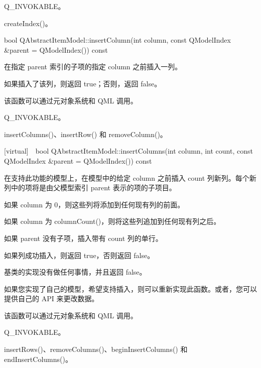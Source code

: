 \begin{seeAlso}
Q\_INVOKABLE。
\end{seeAlso}

\begin{seeAlso}
createIndex()。
\end{seeAlso}

bool QAbstractItemModel::insertColumn(int column, const QModelIndex \&parent = QModelIndex()) const

在指定 parent 索引的子项的指定 column 之前插入一列。

如果插入了该列，则返回 true；否则，返回 false。

\begin{notice}
该函数可以通过元对象系统和 QML 调用。
\end{notice}

\begin{seeAlso}
Q\_INVOKABLE。
\end{seeAlso}

\begin{seeAlso}
insertColumns()、insertRow() 和 removeColumn()。
\end{seeAlso}

[virtual] bool QAbstractItemModel::insertColumns(int column, int
count, const QModelIndex \&parent = QModelIndex()) const

在支持此功能的模型上，在模型中的给定 column 之前插入 count 列新列。每个新列中的项将是由父模型索引 parent 表示的项的子项目。

如果 column 为 0，则这些列将添加到任何现有列的前面。

如果 column 为 columnCount()，则将这些列追加到任何现有列之后。

如果 parent 没有子项，插入带有 count 列的单行。

如果列成功插入，则返回 true，否则返回 false。

基类的实现没有做任何事情，并且返回 false。

如果您实现了自己的模型，希望支持插入，则可以重新实现此函数。或者，您可以提供自己的 API 来更改数据。

\begin{notice}
该函数可以通过元对象系统和 QML 调用。
\end{notice}

\begin{seeAlso}
Q\_INVOKABLE。
\end{seeAlso}

\begin{seeAlso}
insertRows()、removeColumns()、beginInsertColumns() 和 endInsertColumns()。
\end{seeAlso}

